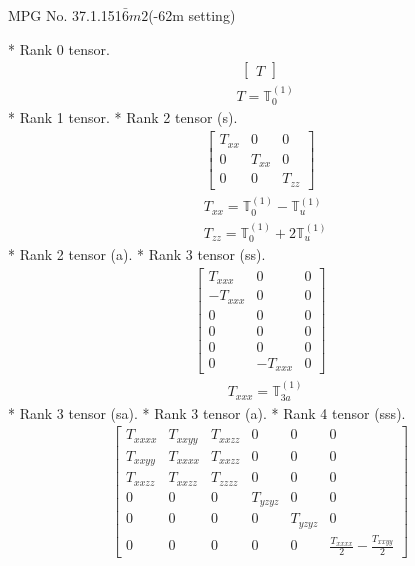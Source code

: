 \documentclass[fleqn,8pt,landscape]{jsarticle}
\begin{document}
\setcounter{MaxMatrixCols}{32}

\renewcommand{\tablename}{Table~}
\renewcommand{\figurename}{Figure~}
\begin{center}
\LARGE
MPG No. 37.1.151\quad$\bar{6}m2$\quad(-62m setting)
\end{center}
* Rank 0 tensor.
\begin{align*}
\begin{bmatrix} T \end{bmatrix}
\end{align*}
\begin{align*}
& T = \mathbb{T}_{0}^{(1)}
\end{align*}
* Rank 1 tensor.
* Rank 2 tensor (s).
\begin{align*}
\begin{bmatrix} T_{xx} & 0 & 0 \\ 0 & T_{xx} & 0 \\ 0 & 0 & T_{zz} \end{bmatrix}
\end{align*}
\begin{align*}
& T_{xx} = \mathbb{T}_{0}^{(1)} - \mathbb{T}_{u}^{(1)} \\
& T_{zz} = \mathbb{T}_{0}^{(1)} + 2 \mathbb{T}_{u}^{(1)}
\end{align*}
* Rank 2 tensor (a).
* Rank 3 tensor (ss).
\begin{align*}
\begin{bmatrix} T_{xxx} & 0 & 0 \\ - T_{xxx} & 0 & 0 \\ 0 & 0 & 0 \\ 0 & 0 & 0 \\ 0 & 0 & 0 \\ 0 & - T_{xxx} & 0 \end{bmatrix}
\end{align*}
\begin{align*}
& T_{xxx} = \mathbb{T}_{3a}^{(1)}
\end{align*}
* Rank 3 tensor (sa).
* Rank 3 tensor (a).
* Rank 4 tensor (sss).
\begin{align*}
\begin{bmatrix} T_{xxxx} & T_{xxyy} & T_{xxzz} & 0 & 0 & 0 \\ T_{xxyy} & T_{xxxx} & T_{xxzz} & 0 & 0 & 0 \\ T_{xxzz} & T_{xxzz} & T_{zzzz} & 0 & 0 & 0 \\ 0 & 0 & 0 & T_{yzyz} & 0 & 0 \\ 0 & 0 & 0 & 0 & T_{yzyz} & 0 \\ 0 & 0 & 0 & 0 & 0 & \frac{T_{xxxx}}{2} - \frac{T_{xxyy}}{2} \end{bmatrix}
\end{align*}
\end{document}
